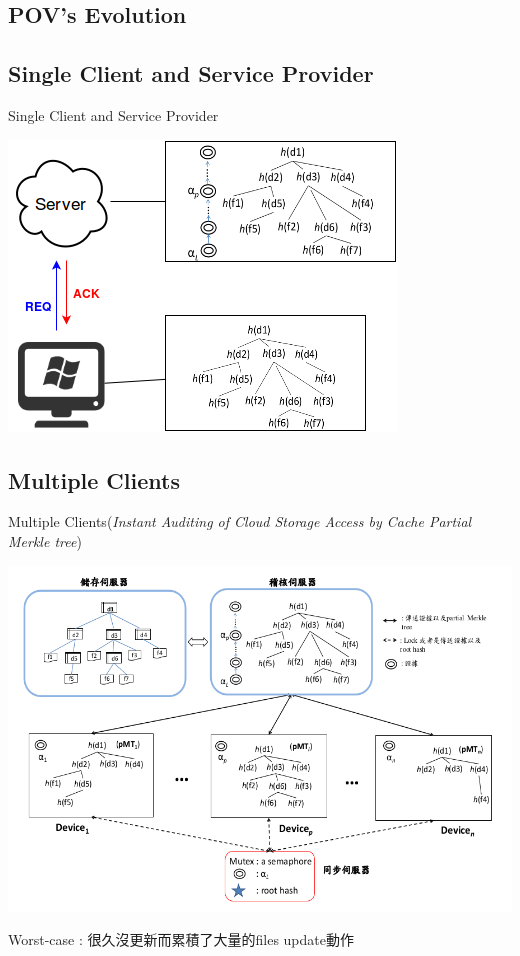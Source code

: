 \documentclass{beamer}
\begin{document}
\begin{CJK}{UTF8}{bkai}
\section{POV's Evolution}
\subsection{Single Client and Service Provider}
\begin{frame}{Single Client and Service Provider}
	\begin{center}
	\includegraphics[width=.7\textwidth]{Case1.png}
	\end{center}
\end{frame}

\subsection{Multiple Clients}
\begin{frame}{Multiple Clients}{(\textit{Instant Auditing of Cloud Storage Access by Cache Partial Merkle tree})}
	\begin{center}
	\includegraphics[width=.8\textwidth]{Case2.png}
	\end{center}
	\alert{Worst-case : 很久沒更新而累積了大量的files update動作}
\end{frame}


\end{CJK}
\end{document}
